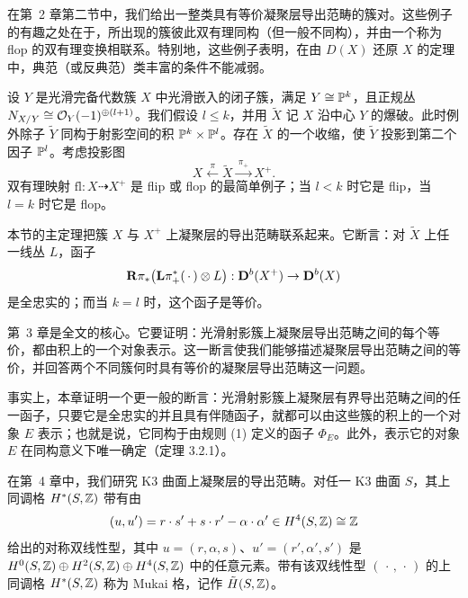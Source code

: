 在第~2 章第二节中，我们给出一整类具有等价凝聚层导出范畴的簇对。这些例子的有趣之处在于，所出现的簇彼此双有理同构（但一般不同构），并由一个称为 flop 的双有理变换相联系。特别地，这些例子表明，在由 $D(X)$ 还原 $X$ 的定理中，典范（或反典范）类丰富的条件不能减弱。

设 $Y$ 是光滑完备代数簇 $X$ 中光滑嵌入的闭子簇，满足 $Y\cong\mathbb{P}^{k}$，且正规丛 $N_{X/Y}\cong\mathcal{O}_Y(-1)^{\oplus(l+1)}$。我们假设 $l\leqslant k$，并用 $\tilde X$ 记 $X$ 沿中心 $Y$ 的爆破。此时例外除子 $\tilde Y$ 同构于射影空间的积 $\mathbb{P}^{k}\times\mathbb{P}^{l}$。存在 $\tilde X$ 的一个收缩，使 $\tilde Y$ 投影到第二个因子 $\mathbb{P}^{l}$。考虑投影图
\begin{equation*}
X\xleftarrow{\ \pi\ }\tilde X\xrightarrow{\ \pi_+\ }X^{+}.
\end{equation*}
双有理映射 $\mathrm{fl}:X\dashrightarrow X^{+}$ 是 flip 或 flop 的最简单例子；当 $l<k$ 时它是 flip，当 $l=k$ 时它是 flop。


本节的主定理把簇 $X$ 与 $X^{+}$ 上凝聚层的导出范畴联系起来。它断言：对 $\tilde X$ 上任一线丛 $L$，函子
\begin{equation*}
\mathbf{R}\pi_*\bigl(\mathbf{L}\pi_+^*(\,\cdot\,)\otimes L\bigr):\mathbf{D}^{b}(X^{+})\to\mathbf{D}^{b}(X)
\end{equation*}
是全忠实的；而当 $k=l$ 时，这个函子是等价。

第~3 章是全文的核心。它要证明：光滑射影簇上凝聚层导出范畴之间的每个等价，都由积上的一个对象表示。这一断言使我们能够描述凝聚层导出范畴之间的等价，并回答两个不同簇何时具有等价的凝聚层导出范畴这一问题。

事实上，本章证明一个更一般的断言：光滑射影簇上凝聚层有界导出范畴之间的任一函子，只要它是全忠实的并且具有伴随函子，就都可以由这些簇的积上的一个对象 $E$ 表示；也就是说，它同构于由规则 (1) 定义的函子 $\Phi_E$。此外，表示它的对象 $E$ 在同构意义下唯一确定（定理 3.2.1）。

在第~4 章中，我们研究 K3 曲面上凝聚层的导出范畴。对任一 K3 曲面 $S$，其上同调格 $H^{*}(S,\mathbb{Z})$ 带有由
\begin{equation*}
(u,u')=r\cdot s'+s\cdot r'-\alpha\cdot\alpha'\in H^{4}(S,\mathbb{Z})\cong\mathbb{Z}
\end{equation*}
给出的对称双线性型，其中 $u=(r,\alpha,s)$、$u'=(r',\alpha',s')$ 是 $H^{0}(S,\mathbb{Z})\oplus H^{2}(S,\mathbb{Z})\oplus H^{4}(S,\mathbb{Z})$ 中的任意元素。带有该双线性型 $(\,\cdot\,,\,\cdot\,)$ 的上同调格 $H^{*}(S,\mathbb{Z})$ 称为 Mukai 格，记作 $\tilde H(S,\mathbb{Z})$。

